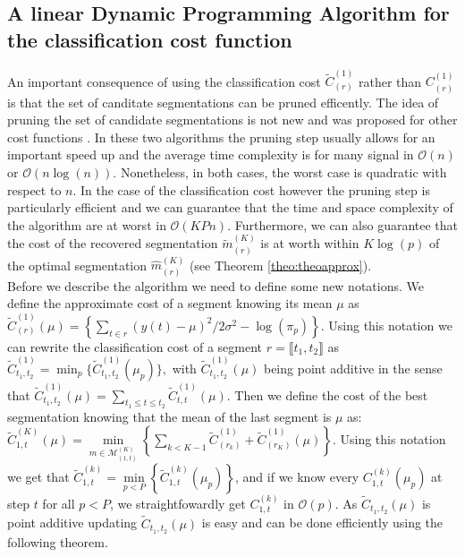 \documentclass[11pt]{llncs}
\begin{document}
\subsection{A linear Dynamic Programming Algorithm for the classification cost function}

An important consequence of using the classification cost $\widetilde{C}_{(r)}^{(1)}$ rather than ${C}_{(r)}^{(1)}$ is that the set of canditate segmentations 
can be pruned efficently. The idea of pruning the set of candidate segmentations
is not new and was proposed for other cost functions  \cite{rigaill_2010,killick_optimal_2011}.
In these two algorithms the pruning step usually allows for an important speed up and the average time complexity is for many signal in $\mathcal{O}(n)$ or  $\mathcal{O}(n\log(n))$. Nonetheless, in both cases, the worst case is quadratic with respect to $n$.
In the case of the classification cost however the pruning step is particularly 
efficient %
and we can guarantee that the time and space complexity of the algorithm are at worst in $\mathcal{O}(KPn)$. 
Furthermore, we can also guarantee that the cost of the recovered segmentation $\widetilde{m}_{(r)}^{(K)}$ is at worth within $K \log(p)$ of the optimal segmentation $\widehat{m}_{(r)}^{(K)}$ (see Theorem \ref{theo:theoapprox}). \\
\indent Before we describe the algorithm we need to define some new notations. We define the approximate cost of a segment knowing its mean $\mu$ as 
$ \widetilde{C}_{(r)}^{(1)}   (\mu) = \left\{ \sum_{t \in r} (y(t)- \mu)^2  /2 \sigma^2  - \log(\pi_p) \right\}.$ Using this notation we can rewrite the classification cost of a segment $r = \llbracket t_1, t_2 \rrbracket$ as $\widetilde{C}_{t_1, t_2}^{(1)}  = \min_p \{  \widetilde{C}_{t_1, t_2}^{(1)}  (\mu_p) \},$ with $\widetilde{C}_{t_1, t_2}^{(1)}  (\mu)$ being point additive in the sense that $\widetilde{C}_{t_1, t_2}^{(1)}  (\mu) = \underset{ t_1 \leq t \leq t_2}{\sum} \widetilde{C}_{t, t}^{(1)}  (\mu).$ Then we define the cost of the best segmentation knowing that the mean of the last segment is $\mu$ as:
$\widetilde{C}_{1, t}^{(K)}(\mu) = \underset{{m \in \mathcal{M}^{(K)}_{(1, t)}}}{\min} \left\{ \sum_{k < K-1}  \widetilde{C}^{(1)}_{(r_k)}  + \widetilde{C}^{(1)}_{(r_K)}(\mu) \right\}.$
Using this notation we get that $ \widetilde{C}_{1, t}^{(k)}  = \underset{p < P}{\min} \left\{ \widetilde{C}_{1, t}^{(k)}(\mu_p) \right\}$, and if we know every $C_{1, t}^{(k)}(\mu_p)$ at step $t$ for all $p< P$, we straightfowardly get $C_{1, t}^{(k)}$ in $\mathcal{O}(p)$. As $\widetilde{C}_{t_1, t_2} (\mu)$ is point additive 
updating $\widetilde{C}_{t_1, t_2} (\mu)$ is easy and can be done efficiently using the following theorem.
\end{document}
